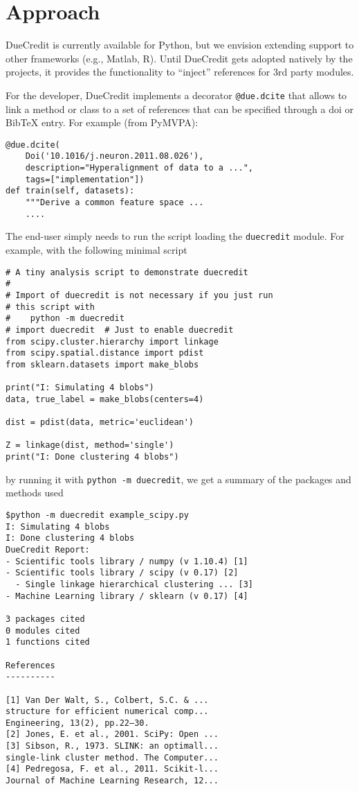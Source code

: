 \documentclass[twocolumn]{bmcart}%
\begin{document}
\section{Approach}\label{approach}

DueCredit is currently available for Python, but we envision extending
support to other frameworks (e.g., Matlab, R). Until DueCredit gets
adopted natively by the projects, it provides the functionality to
``inject'' references for 3rd party modules.

For the developer, DueCredit implements a decorator \texttt{@due.dcite}
that allows to link a method or class to a set of references that can be
specified through a doi or BibTeX entry. For example (from PyMVPA):

\begin{verbatim}
@due.dcite(
    Doi('10.1016/j.neuron.2011.08.026'),
    description="Hyperalignment of data to a ...",
    tags=["implementation"])
def train(self, datasets):
    """Derive a common feature space ...
    ....
\end{verbatim}

The end-user simply needs to run the script loading the
\texttt{duecredit} module. For example, with the following minimal
script

\begin{verbatim}
# A tiny analysis script to demonstrate duecredit
#
# Import of duecredit is not necessary if you just run
# this script with
#    python -m duecredit
# import duecredit  # Just to enable duecredit
from scipy.cluster.hierarchy import linkage
from scipy.spatial.distance import pdist
from sklearn.datasets import make_blobs

print("I: Simulating 4 blobs")
data, true_label = make_blobs(centers=4)

dist = pdist(data, metric='euclidean')

Z = linkage(dist, method='single')
print("I: Done clustering 4 blobs")
\end{verbatim}

by running it with \texttt{python\ -m\ duecredit}, we get a summary of
the packages and methods used

\begin{verbatim}
$python -m duecredit example_scipy.py
I: Simulating 4 blobs
I: Done clustering 4 blobs
DueCredit Report:
- Scientific tools library / numpy (v 1.10.4) [1]
- Scientific tools library / scipy (v 0.17) [2]
  - Single linkage hierarchical clustering ... [3]
- Machine Learning library / sklearn (v 0.17) [4]

3 packages cited
0 modules cited
1 functions cited

References
----------

[1] Van Der Walt, S., Colbert, S.C. & ...
structure for efficient numerical comp...
Engineering, 13(2), pp.22–30.
[2] Jones, E. et al., 2001. SciPy: Open ...
[3] Sibson, R., 1973. SLINK: an optimall...
single-link cluster method. The Computer...
[4] Pedregosa, F. et al., 2011. Scikit-l...
Journal of Machine Learning Research, 12...
\end{verbatim}
\end{document}
